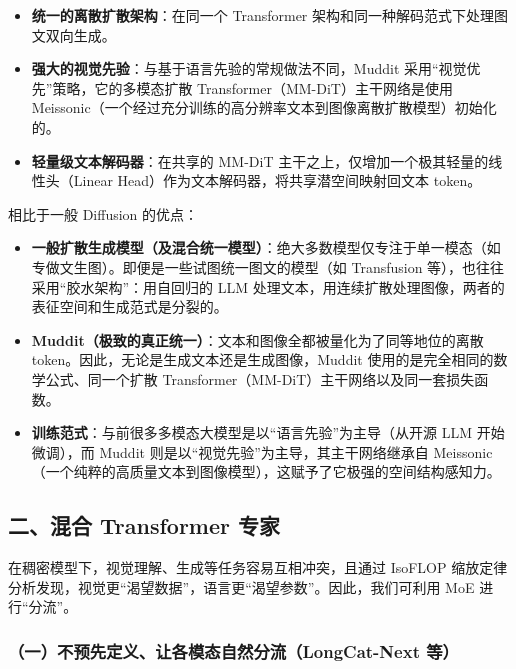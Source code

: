\begin{itemize}
\tightlist
\item
  \textbf{统一的离散扩散架构}：在同一个 Transformer 架构和同一种解码范式下处理图文双向生成。
\item
  \textbf{强大的视觉先验}：与基于语言先验的常规做法不同，Muddit 采用``视觉优先''策略，它的多模态扩散 Transformer（MM-DiT）主干网络是使用 Meissonic（一个经过充分训练的高分辨率文本到图像离散扩散模型）初始化的。
\item
  \textbf{轻量级文本解码器}：在共享的 MM-DiT 主干之上，仅增加一个极其轻量的线性头（Linear Head）作为文本解码器，将共享潜空间映射回文本 token。
\end{itemize}

相比于一般 Diffusion 的优点：

\begin{itemize}
\tightlist
\item
  \textbf{一般扩散生成模型（及混合统一模型）}：绝大多数模型仅专注于单一模态（如专做文生图）。即便是一些试图统一图文的模型（如 Transfusion 等），也往往采用``胶水架构''：用自回归的 LLM 处理文本，用连续扩散处理图像，两者的表征空间和生成范式是分裂的。
\item
  \textbf{Muddit（极致的真正统一）}：文本和图像全都被量化为了同等地位的离散 token。因此，无论是生成文本还是生成图像，Muddit 使用的是完全相同的数学公式、同一个扩散 Transformer（MM-DiT）主干网络以及同一套损失函数。
\item
  \textbf{训练范式}：与前很多多模态大模型是以``语言先验''为主导（从开源 LLM 开始微调），而 Muddit 则是以``视觉先验''为主导，其主干网络继承自 Meissonic（一个纯粹的高质量文本到图像模型），这赋予了它极强的空间结构感知力。
\end{itemize}

\hypertarget{ux4e8cux6df7ux5408-transformer-ux4e13ux5bb6}{%
\subsection{二、混合 Transformer 专家}\label{ux4e8cux6df7ux5408-transformer-ux4e13ux5bb6}}

在稠密模型下，视觉理解、生成等任务容易互相冲突，且通过 IsoFLOP 缩放定律分析发现，视觉更``渴望数据''，语言更``渴望参数''。因此，我们可利用 MoE 进行``分流''。

\hypertarget{ux4e00ux4e0dux9884ux5148ux5b9aux4e49ux8ba9ux5404ux6a21ux6001ux81eaux7136ux5206ux6d41longcat-next-ux7b49}{%
\subsubsection{（一）不预先定义、让各模态自然分流（LongCat-Next 等）}\label{ux4e00ux4e0dux9884ux5148ux5b9aux4e49ux8ba9ux5404ux6a21ux6001ux81eaux7136ux5206ux6d41longcat-next-ux7b49}}

